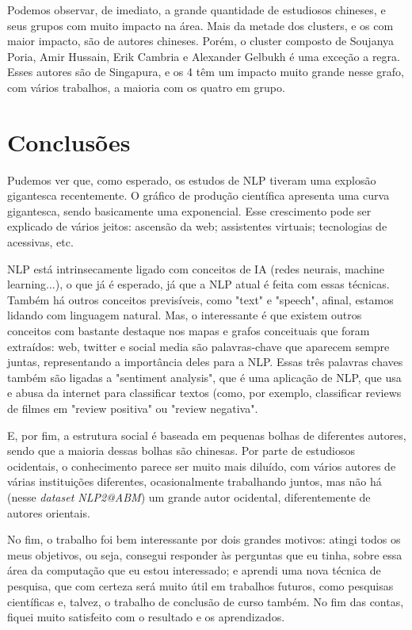 Podemos observar, de imediato, a grande quantidade de estudiosos chineses, e seus grupos com muito impacto na área. Mais da metade dos clusters, e os com maior impacto, são de autores chineses. Porém, o cluster composto de Soujanya Poria, Amir Hussain, Erik Cambria e Alexander Gelbukh é uma exceção a regra. Esses autores são de Singapura, e os 4 têm um impacto muito grande nesse grafo, com vários trabalhos, a maioria com os quatro em grupo.

\section{Conclusões}

Pudemos ver que, como esperado, os estudos de NLP tiveram uma explosão gigantesca recentemente. O gráfico de produção científica apresenta uma curva gigantesca, sendo basicamente uma exponencial. Esse crescimento pode ser explicado de vários jeitos: ascensão da web; assistentes virtuais; tecnologias de acessivas, etc.

NLP está intrinsecamente ligado com conceitos de IA (redes neurais, machine learning...), o que já é esperado, já que a NLP atual é feita com essas técnicas. Também há outros conceitos previsíveis, como "text" e "speech", afinal, estamos lidando com linguagem natural. Mas, o interessante é que existem outros conceitos com bastante destaque nos mapas e grafos conceituais que foram extraídos: web, twitter e social media são palavras-chave que aparecem sempre juntas, representando a importância deles para a NLP. Essas três palavras chaves também são ligadas a "sentiment analysis", que é uma aplicação de NLP, que usa e abusa da internet para classificar textos (como, por exemplo, classificar reviews de filmes em "review positiva" ou "review negativa".

E, por fim, a estrutura social é baseada em pequenas bolhas de diferentes autores, sendo que a maioria dessas bolhas são chinesas. Por parte de estudiosos ocidentais, o conhecimento parece ser muito mais diluído, com vários autores de várias instituições diferentes, ocasionalmente trabalhando juntos, mas não há (nesse \textit{dataset NLP2@ABM}) um grande autor ocidental, diferentemente de autores orientais.

No fim, o trabalho foi bem interessante por dois grandes motivos: atingi todos os meus objetivos, ou seja, consegui responder às perguntas que eu tinha, sobre essa área da computação que eu estou interessado; e aprendi uma nova técnica de pesquisa, que com certeza será muito útil em trabalhos futuros, como pesquisas científicas e, talvez, o trabalho de conclusão de curso também. No fim das contas, fiquei muito satisfeito com o resultado e os aprendizados.


